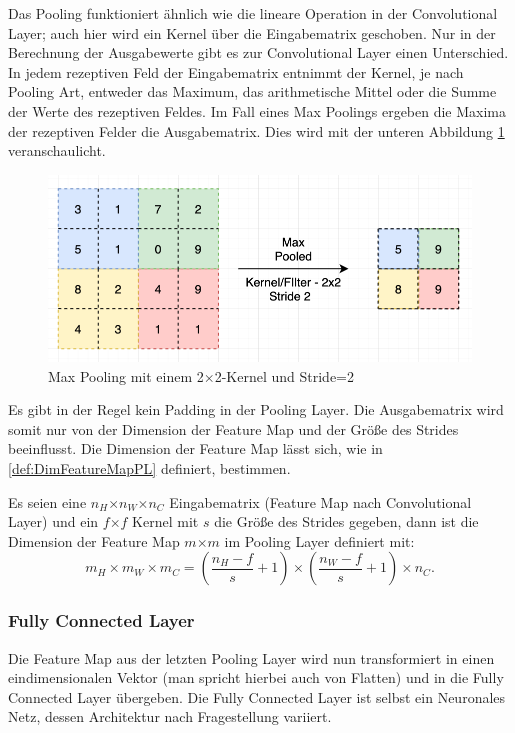 Das Pooling funktioniert ähnlich wie die lineare Operation in der Convolutional Layer; auch hier wird ein Kernel über die Eingabematrix geschoben. Nur in der Berechnung der Ausgabewerte gibt es zur Convolutional Layer einen Unterschied. In jedem rezeptiven Feld der Eingabematrix entnimmt der Kernel, je nach Pooling Art, entweder das Maximum, das arithmetische Mittel oder die Summe der Werte des rezeptiven Feldes. Im Fall eines Max Poolings ergeben die Maxima der rezeptiven Felder die Ausgabematrix. Dies wird mit der unteren Abbildung \ref{pic:MaxPooling} veranschaulicht.

\begin{figure}[H]
\centering
\includegraphics[width=0.5\linewidth]{pic/Klassifikation/MaxPooling.png}
\caption{\label{pic:MaxPooling} Max Pooling mit einem 2$\times$2-Kernel und Stride=2}
\end{figure}

Es gibt in der Regel kein Padding in der Pooling Layer. Die Ausgabematrix wird somit nur von der Dimension der Feature Map und der Größe des Strides beeinflusst. Die Dimension der Feature Map lässt sich, wie in \ref{def:DimFeatureMapPL} definiert, bestimmen.

\begin{Definition} \label{def:DimFeatureMapPL}
Es seien eine $n_{H}$$\times$$n_{W}$$\times$$n_{C}$ Eingabematrix (Feature Map nach Convolutional Layer) und ein $f$$\times$$f$ Kernel mit $s$ die Größe des Strides gegeben, dann ist die Dimension der Feature Map $m$$\times$$m$ im Pooling Layer  definiert mit: 
\begin{equation}
m_{H}\times m_{W}\times m_{C} =  (\frac{n_{H}-f}{s} + 1) \times (\frac{n_{W}-f}{s} + 1) \times n_{C}. \label{Dimension Feature Map im Pooling Layer}
\end{equation}
\end{Definition}

\subsubsection{Fully Connected Layer}
Die Feature Map aus der letzten Pooling Layer wird nun transformiert in einen eindimensionalen Vektor (man spricht hierbei auch von Flatten) und in die Fully Connected Layer übergeben. Die Fully Connected Layer ist selbst ein Neuronales Netz, dessen Architektur nach Fragestellung variiert.

